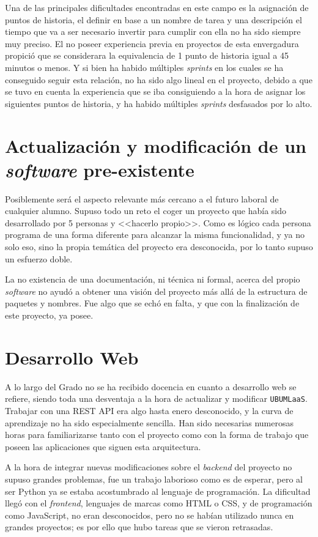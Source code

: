 Una de las principales dificultades encontradas en este campo es la asignación de puntos de historia, el definir en base a un nombre de tarea y una descripción el tiempo que va a ser necesario invertir para cumplir con ella no ha sido siempre muy preciso. El no poseer experiencia previa en proyectos de esta envergadura propició que se considerara la equivalencia de 1 punto de historia igual a 45 minutos o menos. Y si bien ha habido múltiples \textit{sprints} en los cuales se ha conseguido seguir esta relación, no ha sido algo lineal en el proyecto, debido a que se tuvo en cuenta la experiencia que se iba consiguiendo a la hora de asignar los siguientes puntos de historia, y ha habido múltiples \textit{sprints} desfasados por lo alto.

\section{Actualización y modificación de un \textit{software} pre-existente}
Posiblemente será el aspecto relevante más cercano a el futuro laboral de cualquier alumno. Supuso todo un reto el coger un proyecto que había sido desarrollado por 5 personas y <<hacerlo propio>>. Como es lógico cada persona programa de una forma diferente para alcanzar la misma funcionalidad, y ya no solo eso, sino la propia temática del proyecto era desconocida, por lo tanto supuso un esfuerzo doble.

La no existencia de una documentación, ni técnica ni formal, acerca del propio \textit{software} no ayudó a obtener una visión del proyecto más allá de la estructura de paquetes y nombres. Fue algo que se echó en falta, y que con la finalización de este proyecto, ya posee.

\section{Desarrollo Web}
A lo largo del Grado no se ha recibido docencia en cuanto a desarrollo web se refiere, siendo toda una desventaja a la hora de actualizar y modificar \texttt{UBUMLaaS}. Trabajar con una REST API era algo hasta enero desconocido, y la curva de aprendizaje no ha sido especialmente sencilla. Han sido necesarias numerosas horas para familiarizarse tanto con el proyecto como con la forma de trabajo que poseen las aplicaciones que siguen esta arquitectura.

A la hora de integrar nuevas modificaciones sobre el \textit{backend} del proyecto no supuso grandes problemas, fue un trabajo laborioso como es de esperar, pero al ser Python ya se estaba acostumbrado al lenguaje de programación. La dificultad llegó con el \textit{frontend}, lenguajes de marcas como HTML o CSS, y de programación como JavaScript, no eran desconocidos, pero no se habían utilizado nunca en grandes proyectos; es por ello que hubo tareas que se vieron retrasadas. 

